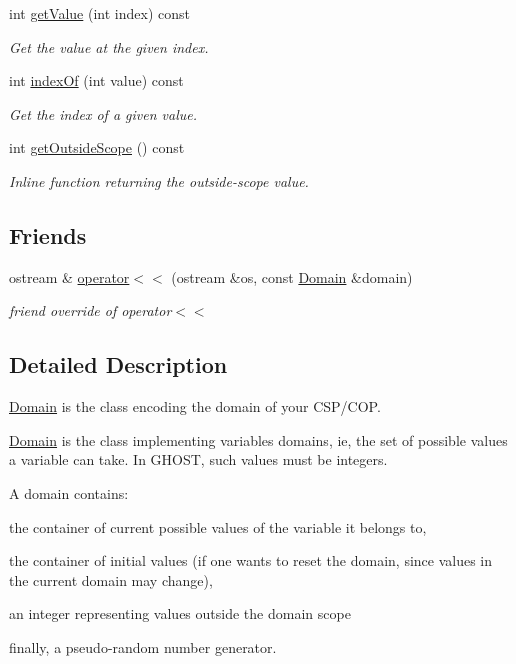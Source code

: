 \begin{DoxyCompactItemize}
int \hyperlink{classghost_1_1Domain_acf7b253ca1c490f90b8f80b5077f9b9c}{get\+Value} (int index) const 
\begin{DoxyCompactList}\small\item\em Get the value at the given index. \end{DoxyCompactList}\item 
int \hyperlink{classghost_1_1Domain_ad82154e314a7f1029e5d1512047460fd}{index\+Of} (int value) const 
\begin{DoxyCompactList}\small\item\em Get the index of a given value. \end{DoxyCompactList}\item 
int \hyperlink{classghost_1_1Domain_a08e1adce30f095a352a3c1a6937e7660}{get\+Outside\+Scope} () const 
\begin{DoxyCompactList}\small\item\em Inline function returning the outside-\/scope value. \end{DoxyCompactList}\end{DoxyCompactItemize}
\subsection*{Friends}
\begin{DoxyCompactItemize}
\item 
ostream \& \hyperlink{classghost_1_1Domain_a608c9910828eb2983efb65ff4c297a4e}{operator$<$$<$} (ostream \&os, const \hyperlink{classghost_1_1Domain}{Domain} \&domain)
\begin{DoxyCompactList}\small\item\em friend override of operator$<$$<$ \end{DoxyCompactList}\end{DoxyCompactItemize}


\subsection{Detailed Description}
\hyperlink{classghost_1_1Domain}{Domain} is the class encoding the domain of your C\+S\+P/\+C\+OP. 

\hyperlink{classghost_1_1Domain}{Domain} is the class implementing variables\textquotesingle{} domains, ie, the set of possible values a variable can take. In G\+H\+O\+ST, such values must be integers.

A domain contains\+:
\begin{DoxyEnumerate}
\item the container of current possible values of the variable it belongs to,
\item the container of initial values (if one wants to reset the domain, since values in the current domain may change),
\item an integer representing values outside the domain scope
\item finally, a pseudo-\/random number generator. 
\end{DoxyEnumerate}

